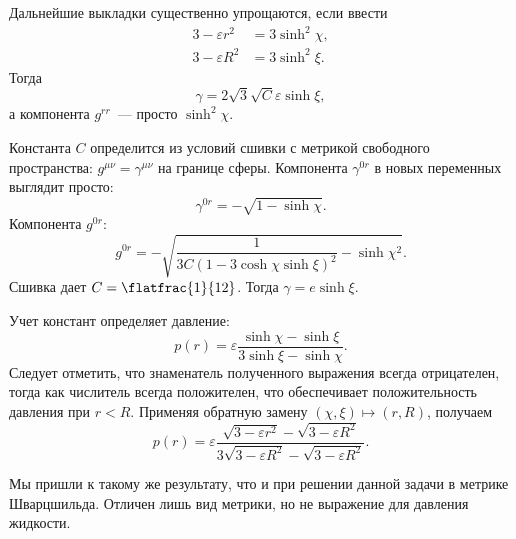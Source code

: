 \documentclass[\docroot/reports/draft/report.tex]{subfiles}
\begin{document}
    Дальнейшие выкладки существенно упрощаются, если ввести
    \begin{align*}
        3 - \varepsilon r^2 &= 3 \sinh^2\chi , \\
        3 - \varepsilon R^2 &= 3 \sinh^2\xi .
    \end{align*}
    Тогда
    \begin{equation*}
        \gamma = 2 \sqrt{3} \sqrt{C} \varepsilon \sinh\xi ,
    \end{equation*}
    а компонента $g^{rr}$~--- просто $\sinh^2\chi$.

    Константа $C$ определится из условий сшивки с метрикой свободного пространства: $g^{\mu\nu} = \gamma^{\mu\nu}$ на границе сферы. Компонента $\gamma^{0r}$ в новых переменных выглядит просто:
    \begin{equation*}
        \gamma^{0r} = - \sqrt{1 - \sinh\chi} .
    \end{equation*}
    Компонента $g^{0r}$:
    \begin{equation*}
        g^{0r} = - \sqrt{
            \frac{1}{3 C (1 - 3 \cosh\chi \sinh\xi)^2} - \sinh\chi^2
        } .
    \end{equation*}
    Сшивка дает $C = \flatfrac{1}{12}$. Тогда $\gamma = e \sinh\xi$.

    Учет констант определяет давление:
    \begin{equation*}
        p(r) = \varepsilon \frac{\sinh\chi - \sinh\xi}{3\sinh\xi - \sinh\chi} .
    \end{equation*}
    Следует отметить, что знаменатель полученного выражения всегда отрицателен, тогда как числитель всегда положителен, что обеспечивает положительность давления при $r < R$. Применяя обратную замену $(\chi,\xi) \mapsto (r,R)$, получаем
    \begin{equation*}
        p(r) = \varepsilon \frac{\sqrt{3 - \varepsilon r^2} - \sqrt{3 - \varepsilon R^2}}{3 \sqrt{3 - \varepsilon R^2} - \sqrt{3 - \varepsilon R^2}} .
    \end{equation*}

    Мы пришли к такому же результату, что и при решении данной задачи в метрике Шварцшильда. Отличен лишь вид метрики, но не выражение для давления жидкости.

\end{document}
